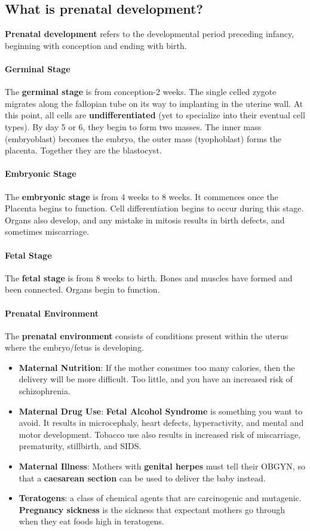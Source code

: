 \documentclass[10pt,letter]{article}
\theoremstyle{plain}
\theoremstyle{definition}
\begin{document}
\subsection*{What is prenatal development?}
\textbf{Prenatal development} refers to the developmental period preceding infancy, beginning with conception and ending with birth. 
\paragraph{Germinal Stage}
The \textbf{germinal stage} is from conception-2 weeks. The single celled zygote migrates along the fallopian tube on its way to implanting in the uterine wall. At this point, all cells are \textbf{undifferentiated} (yet to specialize into their eventual cell types). By day 5 or 6, they begin to form two masses. The inner mass (embryoblast) becomes the embryo, the outer mass (tyophoblast) forms the placenta. Together they are the blastocyst. 

\paragraph{Embryonic Stage}
The \textbf{embryonic stage} is from 4 weeks to 8 weeks. It commences once the Placenta begins to function. Cell differentiation begins to occur during this stage. Organs also develop, and any mistake in mitosis results in birth defects, and sometimes miscarriage. 

\paragraph{Fetal Stage}
The \textbf{fetal stage} is from 8 weeks to birth. Bones and muscles have formed and been connected. Organs begin to function. 

\paragraph{Prenatal Environment}
The \textbf{prenatal environment} consists of conditions present within the uterus where the embryo/fetus is developing. 
\begin{itemize}
    \item \textbf{Maternal Nutrition}: If the mother consumes too many calories, then the delivery will be more difficult. Too little, and you have an increased risk of schizophrenia.
    \item \textbf{Maternal Drug Use}: \textbf{Fetal Alcohol Syndrome} is something you want to avoid. It results in microcephaly, heart defects, hyperactivity, and mental and motor development. Tobacco use also results in increased risk of miscarriage, prematurity, stillbirth, and SIDS.
    \item \textbf{Maternal Illness}: Mothers with \textbf{genital herpes} must tell their OBGYN, so that a \textbf{caesarean section} can be used to deliver the baby instead. 
    \item \textbf{Teratogens}: a class of chemical agents that are carcinogenic and mutagenic. \textbf{Pregnancy sickness} is the sickness that expectant mothers go through when they eat foods high in teratogens. 
\end{itemize}
\end{document}
